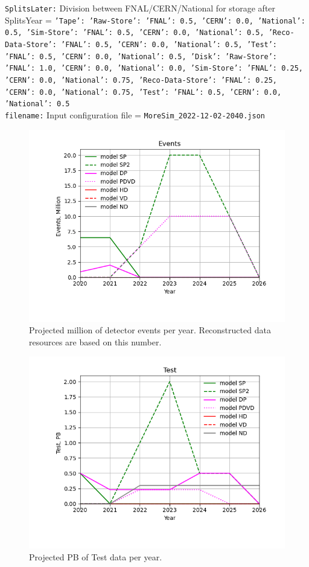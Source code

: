 {\tt SplitsLater:} Division between FNAL/CERN/National for storage after SplitsYear = {\tt {'Tape': {'Raw-Store': {'FNAL': 0.5, 'CERN': 0.0, 'National': 0.5}, 'Sim-Store': {'FNAL': 0.5, 'CERN': 0.0, 'National': 0.5}, 'Reco-Data-Store': {'FNAL': 0.5, 'CERN': 0.0, 'National': 0.5}, 'Test': {'FNAL': 0.5, 'CERN': 0.0, 'National': 0.5}}, 'Disk': {'Raw-Store': {'FNAL': 1.0, 'CERN': 0.0, 'National': 0.0}, 'Sim-Store': {'FNAL': 0.25, 'CERN': 0.0, 'National': 0.75}, 'Reco-Data-Store': {'FNAL': 0.25, 'CERN': 0.0, 'National': 0.75}, 'Test': {'FNAL': 0.5, 'CERN': 0.0, 'National': 0.5}}}} \\
{\tt filename:} Input configuration file = {\tt MoreSim\_2022-12-02-2040.json} \\
\begin{figure}[h]
\centering\includegraphics[height=0.4\textwidth]{MoreSim_2022-12-02-2026/MoreSim_2022-12-02-2026-Events.png}
\caption{Projected million of detector events per year.  Reconstructed data resources are based on this number.}
\label{fig:Events}
\end{figure}
\begin{figure}[h]
\centering\includegraphics[height=0.4\textwidth]{MoreSim_2022-12-02-2026/MoreSim_2022-12-02-2026-Test.png}
\caption{Projected PB of Test data per year.}
\label{fig:Test}
\end{figure}
